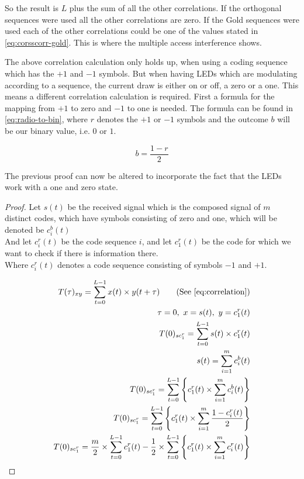 So the result is $L$ plus the sum of all the other correlations. 
If the orthogonal sequences were used all the other correlations are zero.
If the Gold sequences were used each of the other correlations could be one of the values stated in \autoref{eq:corsscorr-gold}.
This is where the multiple access interference shows.



The above correlation calculation only holds up, when using a coding sequence which has the $+1$ and $-1$ symbols.
But when having LEDs which are modulating according to a sequence, the current draw is either on or off, a zero or a one.
This means a different correlation calculation is required.
First a formula for the mapping from $+1$ to zero and $-1$ to one is needed.
The formula can be found in \autoref{eq:radio-to-bin}, where $r$ denotes the $+1$ or $-1$ symbols and the outcome $b$ will be our binary value, i.e. $0$ or $1$.

\begin{equation}
	b = \frac{1 - r}{2}
	\label{eq:radio-to-bin}
\end{equation}


The previous proof can now be altered to incorporate the fact that the LEDs work with a one and zero state.


\begin{proof}
	Let $s(t)$ be the received signal which is the composed signal of $m$ distinct codes, which have symbols consisting of zero and one, which will be denoted be $c^b_i(t)$\\
	And let $c^r_i(t)$ be the code sequence $i$, and let $c^r_1(t)$ be the code for which we want to check if there is information there. \\
	Where $c^r_i(t)$ denotes a code sequence consisting of symbols $-1$ and $+1$.

	\begin{align*}
	T(\tau)_{xy} = \displaystyle\sum_{t = 0} ^ {L - 1} x(t) \times y(t + \tau)	\tag{See \autoref{eq:correlation}}
	\\ \tau = 0,\ x = s(t),\ y = c^r_1(t)
	\\ T(0)_{sc^r_{1}} = \displaystyle\sum_{t = 0} ^ {L - 1} s(t) \times c^r_1(t)	
	\\ s(t) = \displaystyle\sum_{i = 1} ^ {m} c^b_i(t)
	\\ T(0)_{sc^r_{1}} = \displaystyle\sum_{t = 0} ^ {L - 1} \Bigg\{  c^r_1(t)	\times \displaystyle\sum_{i = 1} ^ {m} c^b_i(t) 	\Bigg\}
	\\ T(0)_{sc^r_{1}} = \displaystyle\sum_{t = 0} ^ {L - 1} \Bigg\{  c^r_1(t)	\times \displaystyle\sum_{i = 1} ^ {m} \frac{1 - c^r_i(t)}{2}  	\Bigg\}
	\\ T(0)_{sc^r_{1}} = \frac{m}{2} \times \displaystyle\sum_{t = 0} ^ {L - 1} c^r_1(t) - \frac{1}{2} \times \displaystyle\sum_{t = 0} ^ {L - 1}  \Bigg\{ c^r_1(t) \times \displaystyle\sum_{i = 1} ^ {m} c^r_i(t) \Bigg\}
	\end{align*}

\end{proof}

